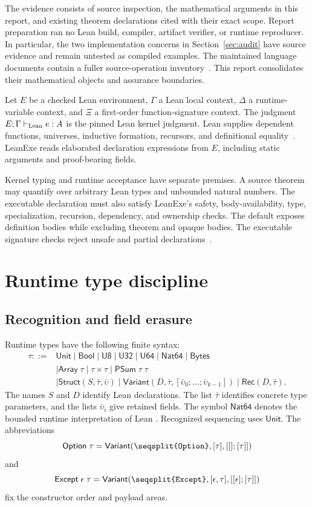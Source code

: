 \documentclass[11pt]{article}
\newcommand{\code}[1]{\texttt{\seqsplit{#1}}}
\newcommand{\ty}[1]{\mathsf{#1}}
\begin{document}
The evidence consists of source inspection, the mathematical arguments in this report, and existing theorem declarations cited with their exact scope.  Report preparation ran no Lean build, compiler, artifact verifier, or runtime reproducer.  In particular, the two implementation concerns in Section~\ref{sec:audit} have source evidence and remain untested as compiled examples.  The maintained language documents contain a fuller source-operation inventory~\cite{typetheory,specification}.  This report consolidates their mathematical objects and assurance boundaries.

Let $E$ be a checked Lean environment, $\Gamma$ a Lean local context, $\Delta$ a runtime-variable context, and $\Xi$ a first-order function-signature context.  The judgment $E;\Gamma\vdash_{\rm Lean} e:A$ is the pinned Lean kernel judgment.  Lean supplies dependent functions, universes, inductive formation, recursors, and definitional equality~\cite{lean}.  LeanExe reads elaborated declaration expressions from $E$, including static arguments and proof-bearing fields.

Kernel typing and runtime acceptance have separate premises.  A source theorem may quantify over arbitrary Lean types and unbounded natural numbers.  The executable declaration must also satisfy LeanExe's safety, body-availability, type, specialization, recursion, dependency, and ownership checks.  The default \code{ConstantInfo.value?} exposes definition bodies while excluding theorem and opaque bodies.  The executable signature checks reject unsafe and partial declarations~\cite{types,extract}.

\section{Runtime type discipline}

\subsection{Recognition and field erasure}

Runtime types have the following finite syntax:
\begin{align*}
\tau ::= {}&\ty{Unit}\mid\ty{Bool}\mid\ty{U8}\mid\ty{U32}\mid\ty{U64}
       \mid\ty{Nat64}\mid\ty{Bytes}\\
 &\mid\ty{Array}\;\tau\mid\tau\times\tau\mid\ty{PSum}\;\tau\;\tau\\
 &\mid\ty{Struct}(S,\bar\tau,\bar\upsilon)
  \mid\ty{Variant}(D,\bar\tau,[\bar\upsilon_0;\ldots;\bar\upsilon_{k-1}])
  \mid\ty{Rec}(D,\bar\tau).
\end{align*}
The names $S$ and $D$ identify Lean declarations.  The list $\bar\tau$ identifies concrete type parameters, and the lists $\bar\upsilon_i$ give retained fields.  The symbol $\ty{Nat64}$ denotes the bounded runtime interpretation of Lean \code{Nat}.  Recognized \code{PUnit} sequencing uses $\ty{Unit}$.  The abbreviations
\[
\ty{Option}\;\tau=\ty{Variant}(\code{Option},[\tau],[[];[\tau]])
\]
and
\[
\ty{Except}\;\epsilon\;\tau
=\ty{Variant}(\code{Except},[\epsilon,\tau],[[\epsilon];[\tau]])
\]
fix the constructor order and payload areas.
\end{document}

